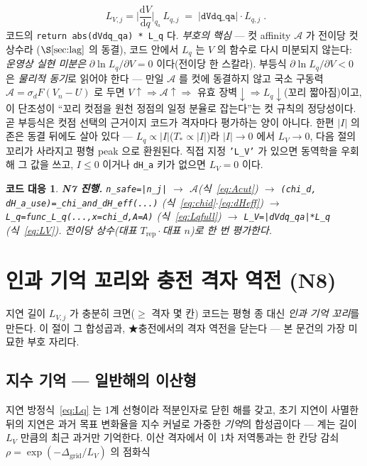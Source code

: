 \documentclass[11pt,a4paper]{article}
\newtheorem*{codebox}{코드 대응}
\newcommand{\dd}{\mathrm{d}}
\newcommand{\rep}{\mathrm{rep}}
\newcommand{\code}[1]{\texttt{#1}}
\begin{document}
\begin{equation}
\boxed{\;L_{V,j}=\Big|\frac{\dd V}{\dd q}\Big|_{q_a}\,L_{q,j}\;=\;|\code{dVdq\_qa}|\cdot L_{q,j}\;.}
\label{eq:LV}
\end{equation}
코드의 \code{return abs(dVdq\_qa) * L\_q} 다. \emph{부호의 핵심} — 컷 affinity $\mathcal A$ 가 전이당 컷 상수라
($\S\ref{sec:lag}$ 의 동결), 코드 안에서 $L_q$ 는 $V$ 의 함수로 다시 미분되지 않는다: \emph{운영상 실현 미분은}
$\partial\ln L_q/\partial V=0$ 이다(전이당 한 스칼라). 부등식 $\partial\ln L_q/\partial V<0$ 은 \emph{물리적 동기}로 읽어야
한다 — 만일 $\mathcal A$ 를 컷에 동결하지 않고 국소 구동력 $\mathcal A=\sigma_dF(V_n-U)$ 로 두면 $V\!\uparrow\Rightarrow
\mathcal A\!\uparrow\Rightarrow$ 유효 장벽$\downarrow\Rightarrow L_q\downarrow$(꼬리 짧아짐)이고, 이 단조성이 ``꼬리 컷점을
원천 정점의 일정 분율로 잡는다''는 컷 규칙의 정당성이다. 곧 부등식은 컷점 선택의 근거이지 코드가 격자마다 평가하는 양이
아니다. 한편 $|I|$ 의존은 동결 뒤에도 살아 있다 — $L_q\propto|I|$($T_*\propto|I|$)라 $|I|\to0$
에서 $L_V\to0$, 다음 절의 꼬리가 사라지고 평형 peak 으로 환원된다. 직접 지정 \code{'L\_V'} 가 있으면 동역학을 우회해
그 값을 쓰고, $I\le0$ 이거나 \code{dH\_a} 키가 없으면 $L_V=0$ 이다.

\begin{codebox}
\textbf{N7 진행.} \code{n\_safe=|n\_j|} $\to$ $\mathcal A$(식~\eqref{eq:Acut}) $\to$
\code{(chi\_d, dH\_a\_use)=\_chi\_and\_dH\_eff(...)} (식~\eqref{eq:chid}$\cdot$\eqref{eq:dHeff}) $\to$
\code{L\_q=func\_L\_q(...,x=chi\_d,A=A)} (식~\eqref{eq:Lqfull}) $\to$ \code{L\_V=|dVdq\_qa|*L\_q} (식~\eqref{eq:LV}).
전이당 \emph{상수}(대표 $T_\rep\cdot$대표 $n$)로 한 번 평가한다.
\end{codebox}

\section{인과 기억 꼬리와 충전 격자 역전 (N8)}\label{sec:tail}
지연 길이 $L_{V,j}$ 가 충분히 크면($\ge$ 격자 몇 칸) 코드는 평형 종 대신 \emph{인과 기억 꼬리}를 만든다. 이 절이 그
합성곱과, ★충전에서의 격자 역전을 닫는다 — 본 문건의 가장 미묘한 부호 자리다.

\subsection{지수 기억 — 일반해의 이산형}
지연 방정식~\eqref{eq:Lq} 는 1계 선형이라 적분인자로 닫힌 해를 갖고, 초기 지연이 사멸한 뒤의 지연은 과거 목표 변화율을
지수 커널로 가중한 \emph{기억}의 합성곱이다 — 계는 길이 $L_{V}$ 만큼의 최근 과거만 기억한다. 이산 격자에서 이 1차
저역통과는 한 칸당 감쇠 $\rho=\exp(-\Delta_\mathrm{grid}/L_V)$ 의 점화식
\end{document}
